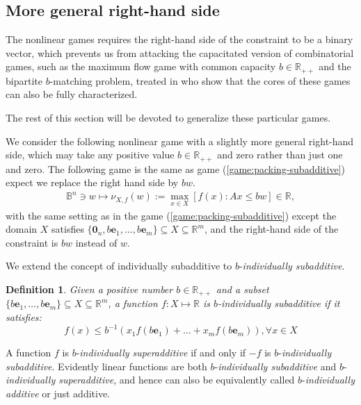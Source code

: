 \documentclass[11pt]{article}\usepackage[]{graphicx}\usepackage[]{xcolor}
\newtheorem{deff}{Definition}
\begin{document}
\subsection{More general right-hand side}\label{subsec:gene-nl-pack-game}

The nonlinear games requires the right-hand side of the constraint to be a binary vector, which prevents us from attacking the capacitated version of combinatorial games, such as the maximum flow game with common capacity $b\in\mathbb{R}_{++}$ and the bipartite $b$-matching problem, treated in \citep{vazirani2023lp} who show that the cores of these games can also be fully characterized. 

The rest of this section will be devoted to generalize these particular games. 

We consider the following nonlinear game with a slightly more general right-hand side, which may take any positive value $b\in \mathbb{R}_{++}$ and zero rather than just one and zero. The following game is the same as game (\ref{game:packing-subadditive}) expect we replace the right hand side by $bw$. 
\begin{eqnarray}
\label{game:packing-subadditive-rhs}\mathbb{B}^n\ni w\mapsto \nu_{X, f}(w):=\max\limits_{x\in X} \left[f(x): Ax\le bw\right]\in  \mathbb{R},
\end{eqnarray}
with the same setting as in the game (\ref{game:packing-subadditive}) except the domain $X$ satisfies $\{\mathbf{0}_n, b\mathbf{e}_1,\dots, b\mathbf{e}_m\}\subseteq X\subseteq \mathbb{R}^m$, and the right-hand side of the constraint is $bw$ instead of $w$. 


We extend the concept of individually subadditive to $b$-\emph{individually subadditive}.
\begin{deff}\label{deff:indiv-supadd_Z^n} Given a positive number $b\in\mathbb{R}_{++}$ and a subset $\{b\mathbf{e}_1,\dots, b\mathbf{e}_m\}\subseteq X\subseteq \mathbb{R}^m$, a function $f: X\mapsto \mathbb{R}$ is $b$-\emph{individually subadditive} if it satisfies:
\begin{equation*}
f(x)\le b^{-1}\left(x_1f(b\mathbf{e}_1)+\dots+x_mf(b\mathbf{e}_m)\right), \forall x\in X
\end{equation*}
\end{deff}
A function $f$ is $b$-\emph{individually superadditive} if and only if $-f$ is $b$-\emph{individually subadditive}. Evidently linear functions are both $b$-\emph{individually subadditive} and $b$-\emph{individually superadditive}, and hence can also be equivalently called $b$-\emph{individually additive} or just additive.
\end{document}

